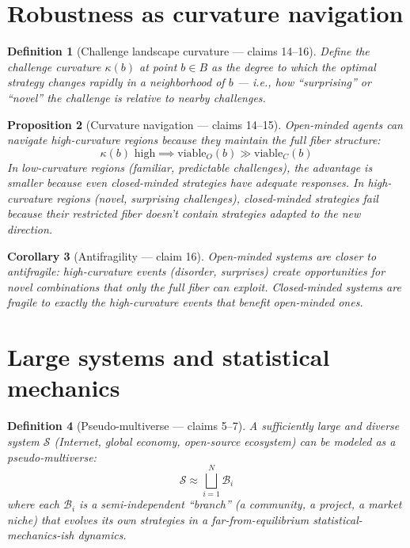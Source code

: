 \documentclass[11pt,a4paper]{article}
\newtheorem{definition}{Definition}[section]
\newtheorem{proposition}[definition]{Proposition}
\newtheorem{corollary}[definition]{Corollary}
\begin{document}
\section{Robustness as curvature navigation}
\label{sec:robustness}

\begin{definition}[Challenge landscape curvature --- claims 14--16]
\label{def:challenge-curvature}
Define the \emph{challenge curvature} $\kappa(b)$ at point $b \in B$ as
the degree to which the optimal strategy changes rapidly in a neighborhood
of $b$ --- i.e., how ``surprising'' or ``novel'' the challenge is relative
to nearby challenges.
\end{definition}

\begin{proposition}[Curvature navigation --- claims 14--15]
\label{prop:curvature-nav}
Open-minded agents can navigate high-curvature regions because they
maintain the full fiber structure:
\[
  \kappa(b) \text{ high} \implies
  \text{viable}_O(b) \gg \text{viable}_C(b)
\]
In low-curvature regions (familiar, predictable challenges), the
advantage is smaller because even closed-minded strategies have
adequate responses. In high-curvature regions (novel, surprising
challenges), closed-minded strategies fail because their restricted
fiber doesn't contain strategies adapted to the new direction.
\end{proposition}

\begin{corollary}[Antifragility --- claim 16]
Open-minded systems are closer to antifragile: high-curvature events
(disorder, surprises) create opportunities for novel combinations that
only the full fiber can exploit. Closed-minded systems are fragile
to exactly the high-curvature events that benefit open-minded ones.
\end{corollary}

\section{Large systems and statistical mechanics}
\label{sec:stat-mech}

\begin{definition}[Pseudo-multiverse --- claims 5--7]
\label{def:pseudo}
A sufficiently large and diverse system $\mathcal{S}$ (Internet, global
economy, open-source ecosystem) can be modeled as a pseudo-multiverse:
\[
  \mathcal{S} \approx \bigsqcup_{i=1}^N \mathcal{B}_i
\]
where each $\mathcal{B}_i$ is a semi-independent ``branch'' (a community,
a project, a market niche) that evolves its own strategies in a
far-from-equilibrium statistical-mechanics-ish dynamics.
\end{definition}
\end{document}
